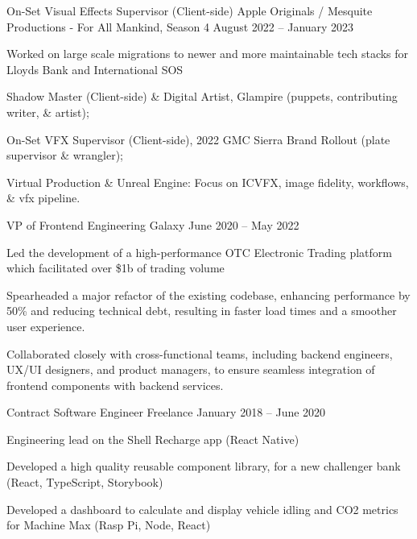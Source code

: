 \documentclass[]{resume-format}
\begin{document}
\begin{cventries}
    \cventry
    { On-Set Visual Effects Supervisor (Client-side) }
    { Apple Originals / Mesquite Productions - For All Mankind, Season 4 }
    {}
    { August 2022 – January 2023 }
    {\begin{cvitems}
        \item { Worked on large scale migrations to newer and more maintainable tech stacks for Lloyds Bank and International SOS }
        \item { Shadow Master (Client-side) \& Digital Artist, Glampire (puppets, contributing writer, \& artist); }
        \item { On-Set VFX Supervisor (Client-side), 2022 GMC Sierra Brand Rollout (plate supervisor \& wrangler); }
        \item { Virtual Production \& Unreal Engine: Focus on ICVFX, image fidelity, workflows, \& vfx pipeline. }
    \end{cvitems}}
    \cventry
    { VP of Frontend Engineering }
    { Galaxy }
    {}
    { June 2020 – May 2022 }
    {\begin{cvitems}
        \item { Led the development of a high-performance OTC Electronic Trading platform which facilitated over \$1b of trading volume }
        \item { Spearheaded a major refactor of the existing codebase, enhancing performance by 50\% and reducing technical debt, resulting in faster load times and a smoother user experience. }
        \item { Collaborated closely with cross-functional teams, including backend engineers, UX/UI designers, and product managers, to ensure seamless integration of frontend components with backend services. }
    \end{cvitems}}
    \cventry
    { Contract Software Engineer }
    { Freelance }
    {}
    { January 2018 – June 2020 }
    {\begin{cvitems}
        \item { Engineering lead on the Shell Recharge app (React Native) }
        \item { Developed a high quality reusable component library, for a new challenger bank (React, TypeScript, Storybook) }
        \item { Developed a dashboard to calculate and display vehicle idling and CO2 metrics for Machine Max (Rasp Pi, Node, React) }
    \end{cvitems}}
    \cventry

\end{cventries}
\end{document}
